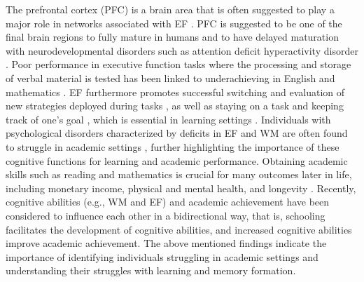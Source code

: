 The prefrontal cortex (PFC) is a brain area that is often suggested to play a major role in networks associated with EF \parencite{diamondNormalDevelopmentPrefrontal2002, fiskeNeuralSubstratesEarly2019}. PFC is suggested to be one of the final brain regions to fully mature in humans and to have delayed maturation with neurodevelopmental disorders such as attention deficit hyperactivity disorder \parencite{kolkDevelopmentPrefrontalCortex2022}.
Poor performance in executive function tasks where the processing and storage of verbal material is tested has been linked to underachieving in English and mathematics \parencite{gathercoleWorkingMemoryDeficits2000}. EF furthermore promotes successful switching and evaluation of new strategies deployed during tasks \parencite{bullExecutiveFunctioningPredictor2001}, as well as staying on a task and keeping track of one's goal \parencite{kaneWorkingmemoryCapacityControl2003}, which is essential in learning settings \parencite{cowanWorkingMemoryUnderpins2014}. Individuals with psychological disorders characterized by deficits in EF and WM are often found to struggle in academic settings \parencite{lonerganMetaanalysisExecutiveFunctioning2019,martinussenMetaanalysisWorkingMemory2005,semrud-clikemanNeuropsychologicalAspectsEvaluating2005,willcuttValidityExecutiveFunction2005}, further highlighting the importance of these cognitive functions for learning and academic performance. Obtaining academic skills such as reading and mathematics is crucial for many outcomes later in life, including monetary income, physical and mental health, and longevity \parencite{calvinChildhoodIntelligenceRelation2017,kuncelFactFictionCognitive2010,wrulichFortyYearsChildhood2014}. Recently, cognitive abilities (e.g., WM and EF) and academic achievement have been considered to influence each other in a bidirectional way, that is, schooling facilitates the development of cognitive abilities, and increased cognitive abilities improve academic achievement\parencite{pengDevelopmentAcademicAchievement2020}. The above mentioned findings indicate the importance of identifying individuals struggling in academic settings and understanding their struggles with learning and memory formation.

